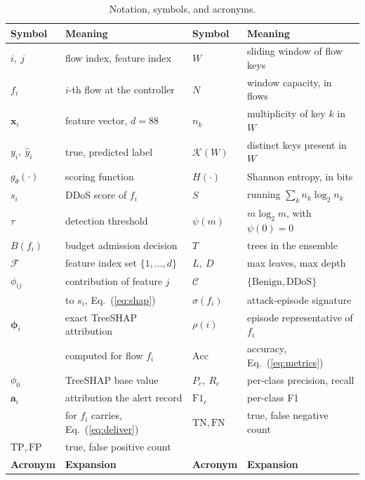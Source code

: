 \documentclass{ieeeaccess}
\begin{document}
\begin{table}[!t]
\caption{Notation, symbols, and acronyms.}
\centering
\label{tab:notation}
\footnotesize
\setlength{\tabcolsep}{3pt}
\renewcommand{\arraystretch}{1.1}
\begin{tabular}{@{}llll@{}}
\toprule
\textbf{Symbol} & \textbf{Meaning} & \textbf{Symbol} & \textbf{Meaning} \\
\midrule
$i,\ j$ & flow index, feature index & $W$ & sliding window of flow keys \\
$f_i$ & $i$-th flow at the controller & $N$ & window capacity, in flows \\
$\mathbf{x}_i$ & feature vector, $d=88$ & $n_k$ & multiplicity of key $k$ in $W$ \\
$y_i,\ \hat{y}_i$ & true, predicted label & $\mathcal{K}(W)$ & distinct keys present in $W$ \\
$g_{\theta}(\cdot)$ & scoring function & $H(\cdot)$ & Shannon entropy, in bits \\
$s_i$ & DDoS score of $f_i$ & $S$ & running $\sum_k n_k\log_2 n_k$ \\
$\tau$ & detection threshold & $\psi(m)$ & $m\log_2 m$, with $\psi(0)=0$ \\
$B(f_i)$ & budget admission decision & $T$ & trees in the ensemble \\
$\mathcal{F}$ & feature index set $\{1,\ldots,d\}$ & $L,\ D$ & max leaves, max depth \\
$\phi_{ij}$ & contribution of feature $j$ & $\mathcal{C}$ & $\{\mathrm{Benign},\mathrm{DDoS}\}$ \\
 & to $s_i$, Eq.~(\ref{eq:shap}) & $\sigma(f_i)$ & attack-episode signature \\
$\boldsymbol{\phi}_i$ & exact TreeSHAP attribution & $\rho(i)$ & episode representative of $f_i$ \\
 & computed for flow $f_i$ & $\mathrm{Acc}$ & accuracy, Eq.~(\ref{eq:metrics}) \\
$\phi_0$ & TreeSHAP base value & $P_c,\ R_c$ & per-class precision, recall \\
$\mathbf{a}_i$ & attribution the alert record & $\mathrm{F1}_c$ & per-class F1 \\
 & for $f_i$ carries, Eq.~(\ref{eq:deliver}) & $\mathrm{TN},\mathrm{FN}$ & true, false negative count \\
$\mathrm{TP},\mathrm{FP}$ & true, false positive count & & \\
\midrule
\textbf{Acronym} & \textbf{Expansion} & \textbf{Acronym} & \textbf{Expansion} \\

\end{tabular}
\end{table}
\end{document}
